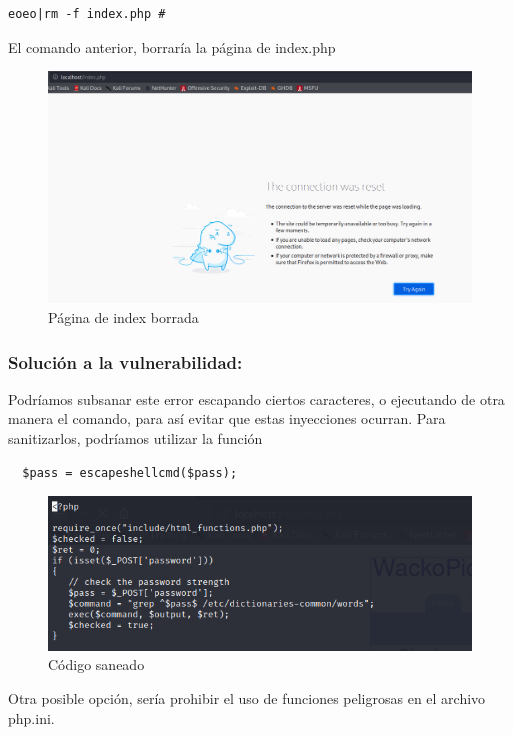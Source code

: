 \documentclass[12pt,twoside]{article}
\begin{document}
\begin{verbatim}
eoeo|rm -f index.php #
\end{verbatim}
El comando anterior, borraría la página de index.php
\begin{figure}[H]
    \centering
    \includegraphics[scale=0.45]{./imagenes/inyeccion_comandos2}
    \caption{Página de index borrada}
\end{figure}

\subsubsection*{Solución a  la vulnerabilidad:}
Podríamos subsanar este error escapando ciertos caracteres, o ejecutando de otra manera el comando, para así evitar que estas inyecciones ocurran.
Para sanitizarlos, podríamos utilizar la función 
\begin{verbatim}
  $pass = escapeshellcmd($pass);
\end{verbatim}
\begin{figure}[H]
    \centering
    \includegraphics[scale=0.5]{./imagenes/inyeccion_comandos_3}
    \caption{Código saneado}
\end{figure}

Otra posible opción, sería prohibir el uso de funciones peligrosas en el archivo php.ini. 
\end{document}
